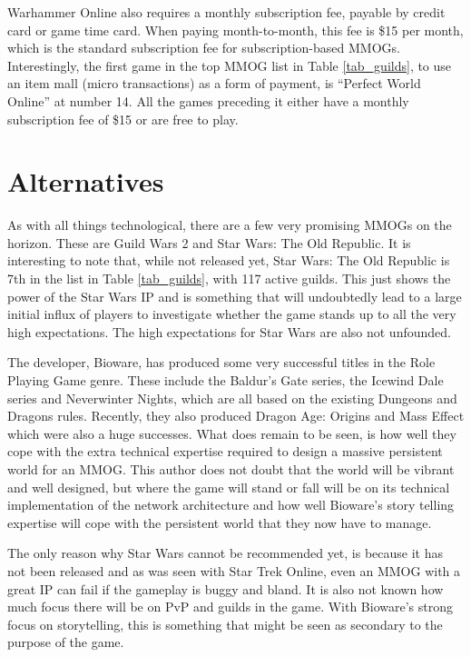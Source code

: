 \documentclass[journal,oneside,a4paper,onecolumn]{IEEEtran}
\begin{document}
Warhammer Online also requires a monthly subscription fee, payable by credit card or game time card. When paying month-to-month, this fee is \$15 per
month, which is the standard subscription fee for subscription-based MMOGs. Interestingly, the first game in the top MMOG list in Table
\ref{tab_guilds}, to use an item mall (micro transactions) as a form of payment, is ``Perfect World Online'' at number 14. All the games preceding it
either have a monthly subscription fee of \$15 or are free to play.

\section{Alternatives}
\label{alternatives}

As with all things technological, there are a few very promising MMOGs on the horizon. These are Guild Wars 2 and Star Wars: The Old Republic. It is
interesting to note that, while not released yet, Star Wars: The Old Republic is 7th in the list in Table \ref{tab_guilds}, with 117 active guilds.
This just shows the power of the Star Wars IP and is something that will undoubtedly lead to a large initial influx of players to investigate whether
the game stands up to all the very high expectations. The high expectations for Star Wars are also not unfounded.

The developer, Bioware, has produced some very successful titles in the Role Playing Game genre. These include the Baldur's Gate series, the Icewind
Dale series and Neverwinter Nights, which are all based on the existing Dungeons and Dragons rules. Recently, they also produced Dragon Age: Origins
and Mass Effect which were also a huge successes. What does remain to be seen, is how well they cope with the extra technical expertise required to
design a massive persistent world for an MMOG. This author does not doubt that the world will be vibrant and well designed, but where the game will
stand or fall will be on its technical implementation of the network architecture and how well Bioware's story telling expertise will cope with the
persistent world that they now have to manage.

The only reason why Star Wars cannot be recommended yet, is because it has not been released and as was seen with Star Trek Online, even an MMOG with
a great IP can fail if the gameplay is buggy and bland. It is also not known how much focus there will be on PvP and guilds in the game. With
Bioware's strong focus on storytelling, this is something that might be seen as secondary to the purpose of the game.
\end{document}
